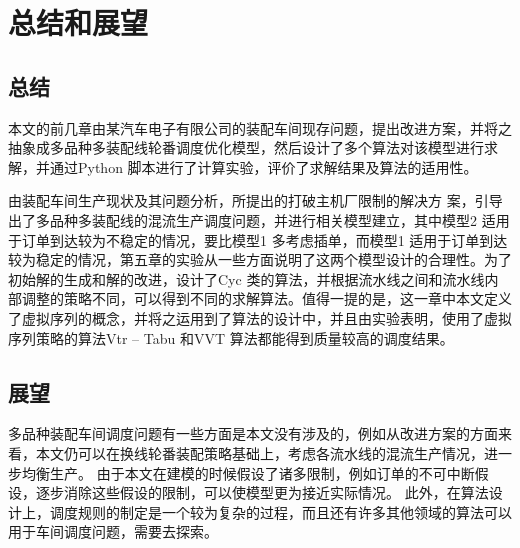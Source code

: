 \chapter{总结和展望}

\section{总结}
本文的前几章由某汽车电子有限公司的装配车间现存问题，提出改进方案，并将之抽象成多品种多装配线轮番调度优化模型，然后设计了多个算法对该模型进行求解，并通过Python 脚本进行了计算实验，评价了求解结果及算法的适用性。

由装配车间生产现状及其问题分析，所提出的打破主机厂限制的解决方
案，引导出了多品种多装配线的混流生产调度问题，并进行相关模型建立，其中模型2 适用于订单到达较为不稳定的情况，要比模型1 多考虑插单，而模型1 适用于订单到达较为稳定的情况，第五章的实验从一些方面说明了这两个模型设计的合理性。为了初始解的生成和解的改进，设计了Cyc 类的算法，并根据流水线之间和流水线内部调整的策略不同，可以得到不同的求解算法。值得一提的是，这一章中本文定义了虚拟序列的概念，并将之运用到了算法的设计中，并且由实验表明，使用了虚拟序列策略的算法Vtr -- Tabu 和VVT 算法都能得到质量较高的调度结果。
\section{展望}
多品种装配车间调度问题有一些方面是本文没有涉及的，例如从改进方案的方面来看，本文仍可以在换线轮番装配策略基础上，考虑各流水线的混流生产情况，进一步均衡生产。
由于本文在建模的时候假设了诸多限制，例如订单的不可中断假设，逐步消除这些假设的限制，可以使模型更为接近实际情况。
此外，在算法设计上，调度规则的制定是一个较为复杂的过程，而且还有许多其他领域的算法可以用于车间调度问题，需要去探索。
